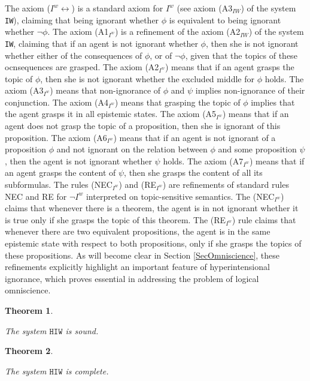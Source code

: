 \documentclass{article}
\newtheorem{theor}{Theorem}
\begin{document}
%

The axiom ($I^{w} \leftrightarrow$) is a standard axiom for $I^{w}$ (see axiom (A3$_{IW}$) of the system \texttt{IW}), claiming that being ignorant whether $\phi$ is equivalent to being ignorant whether $\neg \phi$. The axiom (A1$_{I^{w}}$) is a refinement of the axiom (A2$_{IW}$)  of the system \texttt{IW}, claiming that if an agent is not ignorant whether $\phi$, then she is not ignorant whether either of the consequences of $\phi$, or of $\neg \phi$, given that the topics of these ocnsequences are grasped. The axiom (A2$_{I^{w}}$) means that if an agent grasps the topic of $\phi$, then she is not ignorant whether the excluded middle for $\phi$ holds. The axiom (A3$_{I^{w}}$) means that non-ignorance of $\phi$ and $\psi$ implies non-ignorance of their conjunction. The axiom (A4$_{I^{w}}$) means that grasping the topic of $\phi$ implies that the agent grasps it in all epistemic states. The axiom (A5$_{I^{w}}$) means that if an agent does not grasp the topic of a proposition, then she is ignorant of this proposition. The axiom (A6$_{I^{w}}$) means that if an agent is not ignorant of a proposition $\phi$ and not ignorant on the relation between $\phi$ and some proposition $\psi$, then the agent is not ignorant whether $\psi$ holds. The axiom (A7$_{I^{w}}$) means that if an agent grasps the content of $\psi$, then she grasps the content of all its subformulas. The rules (NEC$_{I^{w}}$)  and (RE$_{I^{w}}$) are refinements of standard rules NEC and RE for $\neg I^{w}$ interpreted on topic-sensitive semantics. The (NEC$_{I^{w}}$) claims that whenever there is a theorem, the agent is in not ignorant whether it is true only if she grasps the topic of this theorem. The (RE$_{I^{w}}$) rule claims that whenever there are two  equivalent propositions, the agent is in the same epistemic state with respect to both propositions, only if she grasps the topics of these propositions. As will become clear in Section \ref{SecOmniscience}, these refinements explicitly highlight an important feature of hyperintensional ignorance, which proves essential in addressing the problem of logical omniscience. 





\begin{theor}
\label{theorHIWsound}

The system $\mathtt{HIW}$ is sound.

\end{theor}


\begin{theor}
\label{theorHIWcomplete}

The system $\mathtt{HIW}$ is complete.

\end{theor}
\end{document}
